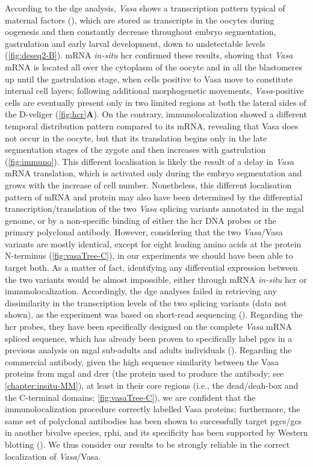 According to the \gls{dge} analysis, \textit{Vasa} shows a transcription pattern typical of maternal factors (), which are stored as transcripts in the oocytes during oogenesis and then constantly decrease throughout embryo segmentation, gastrulation and early larval development, down to undetectable levels (\cref{fig:deseq2-B}). mRNA \textit{in-situ} \gls{hcr} confirmed these results, showing that \textit{Vasa} mRNA is located all over the cytoplasm of the oocyte and in all the blastomeres up until the gastrulation stage, when cells positive to Vasa move to constitute internal cell layers; following additional morphogenetic movements, \textit{Vasa}-positive cells are eventually present only in two limited regions at both the lateral sides of the D-veliger (\cref{fig:hcr}\textbf{A}). On the contrary, immunolocalization showed a different temporal distribution pattern compared to its mRNA, revealing that Vasa does not occur in the oocyte, but that its translation begins only in the late segmentation stages of the zygote and then increases with gastrulation (\cref{fig:immuno}). This different localisation is likely the result of a delay in \textit{Vasa} mRNA translation, which is activated only during the embryo segmentation and grows with the increase of cell number. Nonetheless, this different localisation pattern of mRNA and protein may also have been determined by the differential transcription/translation of the two \textit{Vasa} splicing variants annotated in the \gls{mgal} genome, or by a non-specific binding of either the \gls{hcr} DNA probes or the primary polyclonal antibody. However, considering that the two \textit{Vasa}/Vasa variants are mostly identical, except for eight leading amino acids at the protein N-terminus (\cref{fig:vasaTree-C}), in our experiments we should have been able to target both. As a matter of fact, identifying any differential expression between the two variants would be almost impossible, either through mRNA \textit{in-situ} \gls{hcr} or immunolocalization. Accordingly, the \gls{dge} analyses failed in retrieving any dissimilarity in the transcription levels of the two splicing variants (data not shown), as the experiment was based on short-read sequencing (). Regarding the \gls{hcr} probes, they have been specifically designed on the complete \textit{Vasa} mRNA spliced sequence, which has already been proven to specifically label \glspl{pgc} in a previous analysis on \gls{mgal} sub-adults and adults individuals (). Regarding the commercial antibody, given the high sequence similarity between the Vasa proteins from \gls{mgal} and \gls{drer} (the protein used to produce the antibody; see \cref{chapter:insitu-MM}), at least in their core regions (i.e., the \gls{dead/deah-box} and the C-terminal domains; \cref{fig:vasaTree-C}), we are confident that the immunolocalization procedure correctly labelled Vasa proteins; furthermore, the same set of polyclonal antibodies has been shown to successfully target \glspl{pgc}/\glspl{gc} in another bivalve species, \gls{rphi}, and its specificity has been supported by Western blotting (\cite{filanti2021early}). We thus consider our results to be strongly reliable in the correct localization of \textit{Vasa}/Vasa.

